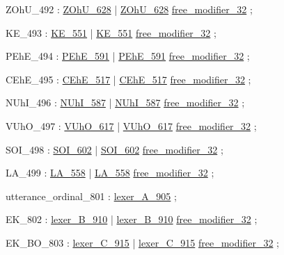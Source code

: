 \label{html:y492}
ZOhU_492                :  \hyperref[html:y628]{ZOhU_628}
                        |  \hyperref[html:y628]{ZOhU_628}  \hyperref[html:y32]{free_modifier_32}
                        ;

\label{html:y493}
KE_493                  :  \hyperref[html:y551]{KE_551}
                        |  \hyperref[html:y551]{KE_551}  \hyperref[html:y32]{free_modifier_32}
                        ;

\label{html:y494}
PEhE_494                :  \hyperref[html:y591]{PEhE_591}
                        |  \hyperref[html:y591]{PEhE_591}  \hyperref[html:y32]{free_modifier_32}
                        ;

\label{html:y495}
CEhE_495                :  \hyperref[html:y517]{CEhE_517}
                        |  \hyperref[html:y517]{CEhE_517}  \hyperref[html:y32]{free_modifier_32}
                        ;

\label{html:y496}
NUhI_496                :  \hyperref[html:y587]{NUhI_587}
                        |  \hyperref[html:y587]{NUhI_587}  \hyperref[html:y32]{free_modifier_32}
                        ;

\label{html:y497}
VUhO_497                :  \hyperref[html:y617]{VUhO_617}
                        |  \hyperref[html:y617]{VUhO_617}  \hyperref[html:y32]{free_modifier_32}
                        ;

\label{html:y498}
SOI_498                 :  \hyperref[html:y602]{SOI_602}
                        |  \hyperref[html:y602]{SOI_602}  \hyperref[html:y32]{free_modifier_32}
                        ;

\label{html:y499}
LA_499                  :  \hyperref[html:y558]{LA_558}
                        |  \hyperref[html:y558]{LA_558}  \hyperref[html:y32]{free_modifier_32}
                        ;

\label{html:y801}
utterance_ordinal_801   :  \hyperref[html:y905]{lexer_A_905}
                        ;

\label{html:y802}
EK_802                  :  \hyperref[html:y910]{lexer_B_910}
                        |  \hyperref[html:y910]{lexer_B_910}  \hyperref[html:y32]{free_modifier_32}
                        ;

\label{html:y803}
EK_BO_803               :  \hyperref[html:y915]{lexer_C_915}
                        |  \hyperref[html:y915]{lexer_C_915}  \hyperref[html:y32]{free_modifier_32}
                        ;

